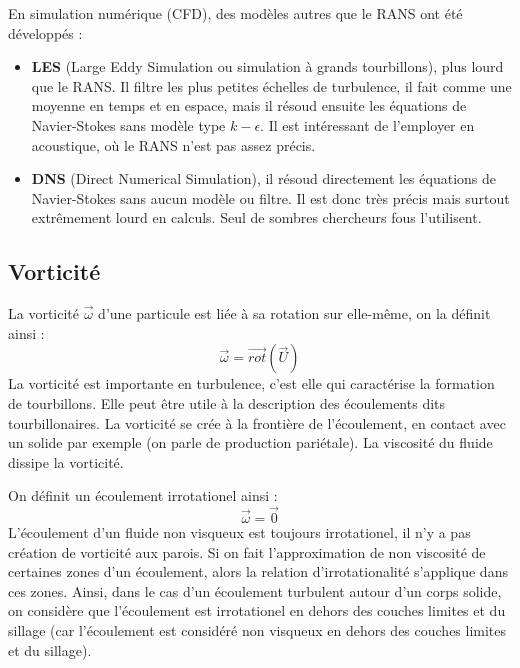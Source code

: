 En simulation numérique (CFD), des modèles autres que le RANS ont été développés :
%
\begin{itemize}
    \item \textbf{LES} (Large Eddy Simulation ou simulation à grands tourbillons), plus lourd que le RANS. Il filtre les plus petites échelles de turbulence, il fait comme une moyenne en temps et en espace, mais il résoud ensuite les équations de Navier-Stokes sans modèle type $k-\epsilon$. Il est intéressant de l'employer en acoustique, où le RANS n'est pas assez précis.
    \item \textbf{DNS} (Direct Numerical Simulation), il résoud directement les équations de Navier-Stokes sans aucun modèle ou filtre. Il est donc très précis mais surtout extrêmement lourd en calculs. Seul de sombres chercheurs fous l'utilisent.
\end{itemize}

\subsection*{Vorticité}

La vorticité $\vec{\omega}$ d'une particule est liée à sa rotation sur elle-même, on la définit ainsi :
%
\begin{equation}
\vec{\omega} = \vec{rot}(\vec{U})
\end{equation}
%
La vorticité est importante en turbulence, c'est elle qui caractérise la formation de tourbillons. Elle peut être utile à la description des écoulements dits tourbillonaires. La vorticité se crée à la frontière de l'écoulement, en contact avec un solide par exemple (on parle de production pariétale). La viscosité du fluide dissipe la vorticité.

On définit un écoulement irrotationel ainsi :
%
\begin{equation}
\vec{\omega} = \vec{0}
\end{equation}
%
L'écoulement d'un fluide non visqueux est toujours irrotationel, il n'y a pas création de vorticité aux parois. Si on fait l'approximation de non viscosité de certaines zones d'un écoulement, alors la relation d'irrotationalité s'applique dans ces zones. Ainsi, dans le cas d'un écoulement turbulent autour d'un corps solide, on considère que l'écoulement est irrotationel en dehors des couches limites et du sillage (car l'écoulement est considéré non visqueux en dehors des couches limites et du sillage).

